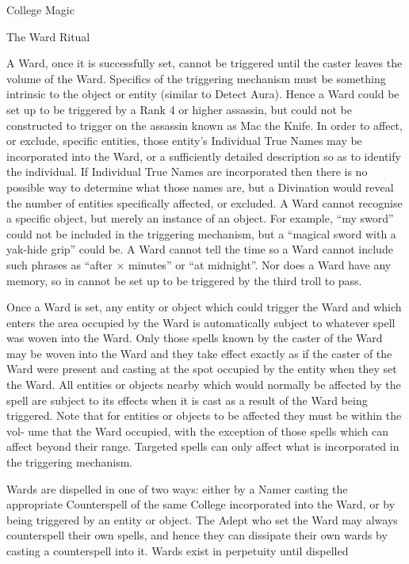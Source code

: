 \begin{Chapter}{College Magic}
\begin{ritual}{The Ward Ritual}
\begin{effects}
A Ward, once it is successfully set, cannot be triggered until the
caster leaves the volume of the Ward.  Specifics of the triggering
mechanism must be something intrinsic to the object or entity (similar
to Detect Aura). Hence a Ward could be set up to be triggered by a
Rank 4 or higher assassin, but could not be constructed to trigger on
the assassin known as Mac the Knife.  In order to affect, or exclude,
specific entities, those entity’s Individual True Names may be
incorporated into the Ward, or a sufficiently detailed description so
as to identify the individual. If Individual True Names are
incorporated then there is no possible way to determine what those
names are, but a Divination would reveal the number of entities
specifically affected, or excluded.  A Ward cannot recognise a
specific object, but merely an instance of an object.  For example,
“my sword” could not be included in the triggering mechanism, but a
“magical sword with a yak-hide grip” could be.  A Ward cannot tell the
time so a Ward cannot include such phrases as “after × minutes” or “at
midnight”.  Nor does a Ward have any memory, so in cannot be set up to
be triggered by the third troll to pass.

Once a Ward is set, any entity or object which could trigger the Ward
and which enters the area occupied by the Ward is automatically
subject to whatever spell was woven into the Ward.  Only those spells
known by the caster of the Ward may be woven into the Ward and they
take effect exactly as if the caster of the Ward were present and
casting at the spot occupied by the entity when they set the Ward.
All entities or objects nearby which would normally be affected by the
spell are subject to its effects when it is cast as a result of the
Ward being triggered.  Note that for entities or objects to be
affected they must be within the vol- ume that the Ward occupied, with
the exception of those spells which can affect beyond their range.
Targeted spells can only affect what is incorporated in the triggering
mechanism.

Wards are dispelled in one of two ways: either by a Namer casting the
appropriate Counterspell of the same College incorporated into the
Ward, or by being triggered by an entity or object.  The Adept who set
the Ward may always counterspell their own spells, and hence they can
dissipate their own wards by casting a counterspell into it. Wards
exist in perpetuity until dispelled
\end{effects}
\end{ritual}



\end{Chapter}
